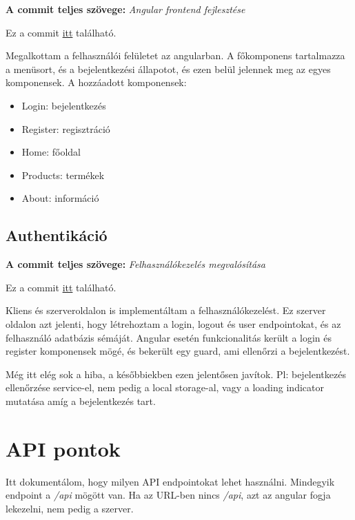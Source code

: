 \documentclass[]{article}
\begin{document}
\noindent
\textbf{A commit teljes szövege:} \textit{Angular frontend fejlesztése}

\bigskip
\noindent
Ez a commit \href{https://github.com/Gtomika/prf-project/commit/53e7acb28718a72afb40870192a166d8839e0d08}{itt} található.
\bigskip

Megalkottam a felhasználói felületet az angularban. A főkomponens tartalmazza a menüsort, és a bejelentkezési állapotot, és ezen belül jelennek meg az egyes komponensek. A hozzáadott komponensek:

\begin{itemize}
	\item Login: bejelentkezés
	\item Register: regisztráció
	\item Home: főoldal
	\item Products: termékek
	\item About: információ
\end{itemize}

\subsection{Authentikáció}

\noindent
\textbf{A commit teljes szövege:} \textit{Felhasználókezelés megvalósítása}

\bigskip
\noindent
Ez a commit \href{https://github.com/Gtomika/prf-project/commit/ac23392a3ebe9a36ad80a358ebb768bba0434b408}{itt} található.
\bigskip

Kliens és szerveroldalon is implementáltam a felhasználókezelést. Ez szerver oldalon azt jelenti, hogy létrehoztam a login, logout és user endpointokat, és az felhasználó adatbázis sémáját. Angular esetén funkcionalitás került a login és register komponensek mögé, és bekerült egy guard, ami ellenőrzi a bejelentkezést.

Még itt elég sok a hiba, a későbbiekben ezen jelentősen javítok. Pl: bejelentkezés ellenőrzése service-el, nem pedig a local storage-al, vagy a loading indicator mutatása amíg a bejelentkezés tart.

\section{API pontok}

Itt dokumentálom, hogy milyen API endpointokat lehet használni. Mindegyik endpoint a \textit{/api} mögött van. Ha az URL-ben nincs \textit{/api}, azt az angular fogja lekezelni, nem pedig a szerver.
\end{document}
